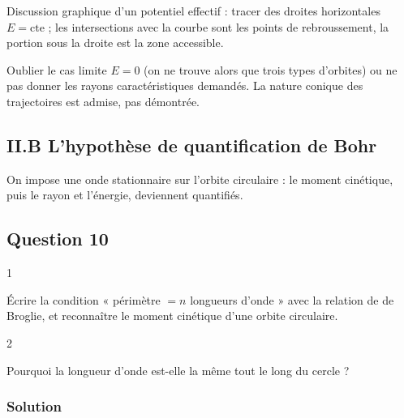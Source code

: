 \documentclass[11pt,a4paper]{article}
\begin{document}
\begin{methode}

Discussion graphique d'un potentiel effectif : tracer des droites horizontales \(E=\text{cte}\) ; les intersections avec la courbe sont les points de rebroussement, la portion sous la droite est la zone accessible.

\end{methode}

\begin{piege}

Oublier le cas limite \(E=0\) (on ne trouve alors que trois types d'orbites) ou ne pas donner les rayons caractéristiques demandés. La nature conique des trajectoires est admise, pas démontrée.

\end{piege}

\hypertarget{ii.b-lhypothuxe8se-de-quantification-de-bohr}{%
\subsection{II.B L'hypothèse de quantification de Bohr}\label{ii.b-lhypothuxe8se-de-quantification-de-bohr}}

On impose une onde stationnaire sur l'orbite circulaire : le moment cinétique, puis le rayon et l'énergie, deviennent quantifiés.

\hypertarget{question-10}{%
\subsection{Question 10}\label{question-10}}

\begin{indication}{1}

Écrire la condition « périmètre \(=n\) longueurs d'onde » avec la relation de de Broglie, et reconnaître le moment cinétique d'une orbite circulaire.

\end{indication}

\begin{indication}{2}

Pourquoi la longueur d'onde est-elle la même tout le long du cercle ?

\end{indication}

\hypertarget{solution-9}{%
\subsubsection{Solution}\label{solution-9}}
\end{document}
